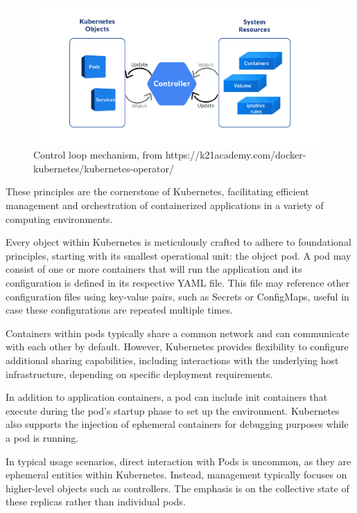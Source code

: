 \begin{figure}[ht]\centering
\includegraphics[scale=0.7]{Pictures/loop}
\caption{Control loop mechanism, from https://k21academy.com/docker-kubernetes/kubernetes-operator/}\label{fig:loop2}
\end{figure}

These principles are the cornerstone of Kubernetes, facilitating efficient management and orchestration of containerized applications in a variety of computing environments.

Every object within Kubernetes is meticulously crafted to adhere to foundational principles, starting with its smallest operational unit: the object pod. A pod may consist of one or more containers that will run the application and its configuration is defined in its respective YAML file. This file may reference other configuration files using key-value pairs, such as Secrets or ConfigMaps, useful in case these configurations are repeated multiple times. 

Containers within pods typically share a common network and can communicate with each other by default. However, Kubernetes provides flexibility to configure additional sharing capabilities, including interactions with the underlying host infrastructure, depending on specific deployment requirements.

In addition to application containers, a pod can include init containers that execute during the pod's startup phase to set up the environment. Kubernetes also supports the injection of ephemeral containers for debugging purposes while a pod is running.

In typical usage scenarios, direct interaction with Pods is uncommon, as they are ephemeral entities within Kubernetes. Instead, management typically focuses on higher-level objects such as controllers. The emphasis is on the collective state of these replicas rather than individual pods.

